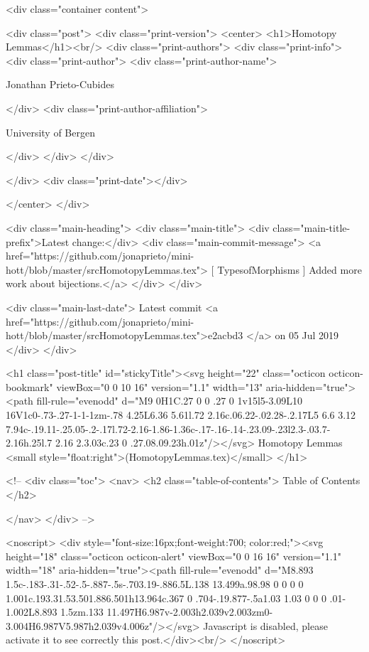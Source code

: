       <div class="container content">
        







<div class="post">
  <div class="print-version">
    <center>
      <h1>Homotopy Lemmas</h1><br/>
        <div class="print-authors">
          <div class="print-info">
            <div class="print-author">
              <div class="print-author-name">
                
                  Jonathan Prieto-Cubides
                
              </div>
              <div class="print-author-affiliation">
                
                  University of Bergen
                
                </div>
            </div>
          </div>
          
          
        </div>
        <div class="print-date"></div>
        
        
    </center>
  </div>

  
  <div class="main-heading">
    <div class="main-title">
      <div class="main-title-prefix">Latest change:</div>
      <div class="main-commit-message">
            <a href="https://github.com/jonaprieto/mini-hott/blob/master/srcHomotopyLemmas.tex">
              [ TypesofMorphisms ] Added more work about bijections.</a>
      </div>
    </div>

    <div class="main-last-date">
      Latest commit <a href="https://github.com/jonaprieto/mini-hott/blob/master/srcHomotopyLemmas.tex">e2acbd3 </a> on  05 Jul 2019
    </div>
  </div>
  

  <h1 class="post-title" id="stickyTitle"><svg height="22" class="octicon octicon-bookmark" viewBox="0 0 10 16" version="1.1" width="13" aria-hidden="true"><path fill-rule="evenodd" d="M9 0H1C.27 0 0 .27 0 1v15l5-3.09L10 16V1c0-.73-.27-1-1-1zm-.78 4.25L6.36 5.61l.72 2.16c.06.22-.02.28-.2.17L5 6.6 3.12 7.94c-.19.11-.25.05-.2-.17l.72-2.16-1.86-1.36c-.17-.16-.14-.23.09-.23l2.3-.03.7-2.16h.25l.7 2.16 2.3.03c.23 0 .27.08.09.23h.01z"/></svg> Homotopy Lemmas <small style="float:right">(HomotopyLemmas.tex)</small>
  </h1>

  <!-- 
  <div class="toc">
    <nav>
    <h2 class="table-of-contents"> Table of Contents </h2>
      

    </nav>
  </div>
   -->

  <noscript>
  <div style="font-size:16px;font-weight:700; color:red;"><svg height="18" class="octicon octicon-alert" viewBox="0 0 16 16" version="1.1" width="18" aria-hidden="true"><path fill-rule="evenodd" d="M8.893 1.5c-.183-.31-.52-.5-.887-.5s-.703.19-.886.5L.138 13.499a.98.98 0 0 0 0 1.001c.193.31.53.501.886.501h13.964c.367 0 .704-.19.877-.5a1.03 1.03 0 0 0 .01-1.002L8.893 1.5zm.133 11.497H6.987v-2.003h2.039v2.003zm0-3.004H6.987V5.987h2.039v4.006z"/></svg> Javascript is disabled, please activate it to see correctly this post.</div><br/>
  </noscript>

